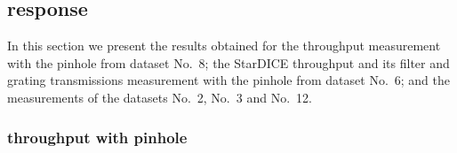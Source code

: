 %
%
%
%
%
%
%

\subsection{\SD response}

In this section we present the results obtained for the \SD throughput measurement with the \bpinhole pinhole from dataset No.~8; the StarDICE throughput and its filter and grating transmissions measurement with the \spinhole pinhole from dataset No.~6; and the measurements of the datasets No.~2, No.~3 and No.~12. 

\subsubsection{\SD throughput with \bpinhole pinhole}

